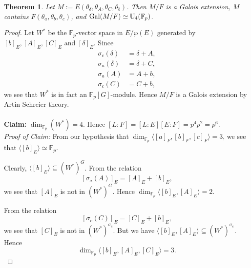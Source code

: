\documentclass[12pt,leqno]{amsart}
\theoremstyle{plain}
\newtheorem{thm}{Theorem}[section]
\theoremstyle{definition}
\newcommand{\F}{{\mathbb F}}
\newcommand{\U}{{\mathbb U}}
\begin{document}
\begin{thm} 
\label{thm:construction char p}
 Let $M:= E(\theta_{\delta},\theta_{A},\theta_{C},\theta_{b})$. Then $M/F$ is a Galois extension, $M$ contains $F(\theta_{a},\theta_{b},\theta_{c})$, and ${\rm Gal}(M/F)\simeq \U_4(\F_p)$.
\end{thm}
\begin{proof}
Let $W^*$ be the $\F_p$-vector space in $E/\wp(E)$ generated by $[b]_E,[A]_E,[C]_E$ and $[\delta]_E$. Since 
\[
\begin{aligned}
\sigma_c(\delta)&= \delta +A,\\
\sigma_a(\delta)&=\delta+ C,\\
\sigma_a(A)&=A+b,\\
\sigma_c(C)&=C+b,
\end{aligned}
\]
we see that $W^*$ is in fact an $\F_p[G]$-module. Hence $M/F$ is a Galois extension by Artin-Schreier  theory.
\\
\\
{\bf Claim:} $\dim_{\F_p}(W^*)=4$. Hence $[L:F]=[L:E][E:F]=p^4p^2=p^6.$\\
{\it Proof of Claim:} From our hypothesis that $\dim_{\F_p}\langle [a]_F,[b]_F,[c]_F\rangle=3$, we see that $\langle [b]_E\rangle \simeq \F_p$. 

Clearly, $\langle[b]_E\rangle \subseteq (W^*)^G$.
From the relation 
\[
[\sigma_a(A)]_E= [A]_E+ [b]_E,
\]
we see that $[A]_E$  is not in $(W^*)^G$. Hence $\dim_{\F_p}\langle [b]_E,[A]_E\rangle=2$.

From the relation 
\[  [\sigma_c(C)]_E= [C]_E+ [b]_E,
\]
we see that $[C]_E$ is not in $(W^*)^{\sigma_c}$. But we have $\langle [b]_E,[A]_E\rangle\subseteq (W^*)^{\sigma_c}$. Hence
\[
\dim_{\F_p}\langle [b]_E,[A]_E,[C]_E\rangle =3.
\]


\end{proof}
\end{document}
